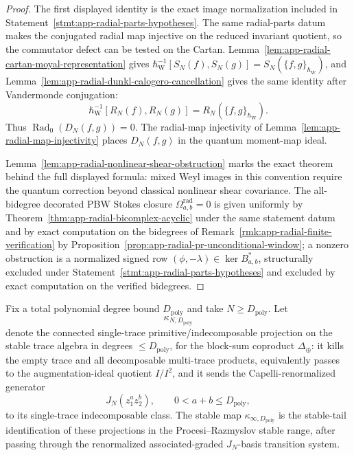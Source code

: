 \begin{proof}
  The first displayed identity is the exact image normalization
  included in Statement~\ref{stmt:app-radial-parts-hypotheses}.  The
  same radial-parts datum makes the conjugated radial map injective
  on the reduced invariant quotient, so the commutator defect can be
  tested on the Cartan.
  Lemma~\ref{lem:app-radial-cartan-moyal-representation} gives
  \(\hbar_{\mathrm{W}}^{-1}[S_N(f),S_N(g)]=S_N(\{f,g\}_{\hbar_{\mathrm{W}}})\), and
  Lemma~\ref{lem:app-radial-dunkl-calogero-cancellation} gives the
  same identity after Vandermonde conjugation:
  \[
    \hbar_{\mathrm{W}}^{-1}[R_N(f),R_N(g)]=R_N(\{f,g\}_{\hbar_{\mathrm{W}}}).
  \]
  Thus \(\operatorname{Rad}_0(D_N(f,g))=0\).  The radial-map
  injectivity of Lemma~\ref{lem:app-radial-map-injectivity} places
  \(D_N(f,g)\) in the quantum moment-map ideal.

  Lemma~\ref{lem:app-radial-nonlinear-shear-obstruction} marks the
  exact theorem behind the full displayed formula: mixed Weyl
  images in this convention require the quantum correction beyond
  classical nonlinear shear covariance.  The all-bidegree decorated PBW Stokes
  closure \(\Omega^{\mathrm{rad}}_{a,b}=0\) is given uniformly by
  Theorem~\ref{thm:app-radial-bicomplex-acyclic} under the same
  statement datum and by exact computation on the bidegrees of
  Remark~\ref{rmk:app-radial-finite-verification} by
  Proposition~\ref{prop:app-radial-pr-unconditional-window}; a
  nonzero obstruction is a normalized signed row
  \((\phi,-\lambda)\in\ker B_{a,b}^*\), structurally excluded under
  Statement~\ref{stmt:app-radial-parts-hypotheses} and excluded by exact
  computation on the verified bidegrees.
\end{proof}

\begin{defn}
\label{def:app-radial-stable-primitive-extraction}
  Fix a total polynomial degree bound \(D_{\mathrm{poly}}\) and take
  \(N\geq D_{\mathrm{poly}}\).  Let
  \[
    \kappa_{N,D_{\mathrm{poly}}}
  \]
  denote the connected single-trace primitive/indecomposable projection
  on the stable trace algebra in degrees \(\leq D_{\mathrm{poly}}\), for
  the block-sum coproduct \(\Delta_\oplus\): it kills the empty trace and
  all decomposable multi-trace products, equivalently passes to the
  augmentation-ideal quotient \(I/I^2\), and it sends the
  Capelli-renormalized generator
  \[
    J_N(z_1^az_2^b),\qquad 0<a+b\leq D_{\mathrm{poly}},
  \]
  to its single-trace indecomposable class.  The stable map
  \(\kappa_{\infty,D_{\mathrm{poly}}}\) is the stable-tail identification of these
  projections in the Procesi--Razmyslov stable range, after passing
  through the renormalized associated-graded \(J_N\)-basis transition
  system.
\end{defn}

